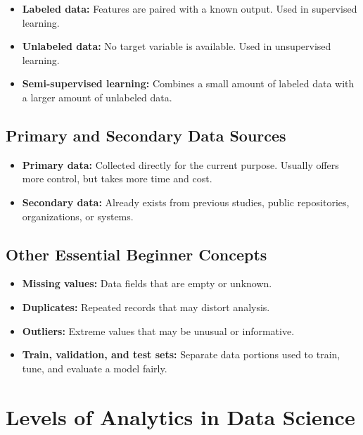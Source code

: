 \documentclass[11pt,a4paper]{article}
\begin{document}
\begin{itemize}[leftmargin=*]
  \item \textbf{Labeled data:} Features are paired with a known output. Used in supervised learning.
  \item \textbf{Unlabeled data:} No target variable is available. Used in unsupervised learning.
  \item \textbf{Semi-supervised learning:} Combines a small amount of labeled data with a larger amount of unlabeled data.
\end{itemize}

\subsection{Primary and Secondary Data Sources}

\begin{itemize}[leftmargin=*]
  \item \textbf{Primary data:} Collected directly for the current purpose. Usually offers more control, but takes more time and cost.
  \item \textbf{Secondary data:} Already exists from previous studies, public repositories, organizations, or systems.
\end{itemize}

\subsection{Other Essential Beginner Concepts}

\begin{itemize}[leftmargin=*]
  \item \textbf{Missing values:} Data fields that are empty or unknown.
  \item \textbf{Duplicates:} Repeated records that may distort analysis.
  \item \textbf{Outliers:} Extreme values that may be unusual or informative.
  \item \textbf{Train, validation, and test sets:} Separate data portions used to train, tune, and evaluate a model fairly.
\end{itemize}

\section{Levels of Analytics in Data Science}
\end{document}
